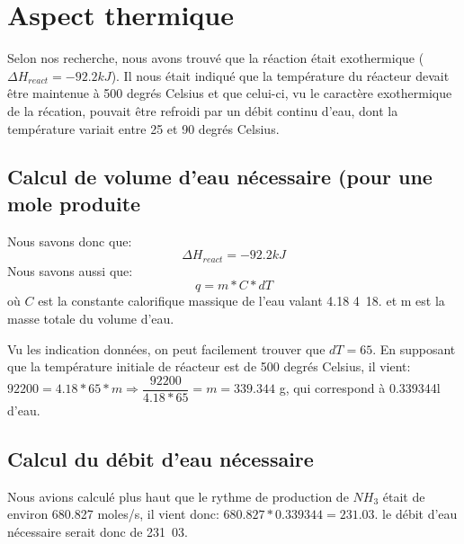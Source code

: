 \documentclass[11pt,a4paper]{report}
\begin{document}
\section{Aspect thermique}
Selon nos recherche, nous avons trouvé que la réaction était exothermique ($\Delta H_{react} = -92.2kJ$).
Il nous était indiqué que la température du réacteur devait être maintenue à 500 degrés Celsius et que celui-ci, 
vu le caractère exothermique de la récation, pouvait être refroidi par un débit continu d'eau, dont la température 
variait entre 25 et 90 degrés Celsius.

\subsection{Calcul de volume d'eau nécessaire (pour une mole produite}
Nous savons donc que: $$\Delta H_{react} = -92.2kJ$$
Nous savons aussi que:
 $$q = m*C*dT$$
 où $C$ est la constante calorifique massique de l'eau valant 4.18 \unit{4.18}{\joule\per\celcisus.\gram} et m est 
 la masse totale du volume d'eau.

 Vu les indication données, on peut facilement trouver que $dT=65$. En supposant que la température initiale de 
 réacteur est de 500 degrés Celsius, il vient: 
$92200 = 4.18*65*m \Rightarrow \dfrac{92200}{4.18*65} = m = 339.344$ g, qui correspond à 0.339344l d'eau.

\subsection{Calcul du débit d'eau nécessaire}

Nous avions calculé plus haut que le rythme de production de $NH_3$ était de environ 680.827 moles/s, il vient donc: 
$680.827*0.339344 = 231.03$. 
le débit d'eau nécessaire serait donc de \unit{231.03}{\liter\per\second}.
\end{document}
